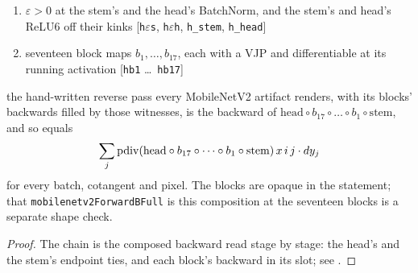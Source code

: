 \begin{theorem}
  \label{thm:mobilenetv2_whole_back}
  \leanok
  \Assume{}
  \begin{enumerate}
    \item \(\varepsilon > 0\) at the stem's and the head's BatchNorm, and the
          stem's and head's ReLU6 off their kinks
          \hfill[\texttt{h\(\varepsilon\)s}, \texttt{h\(\varepsilon\)h}, \texttt{h\_stem}, \texttt{h\_head}]
    \item seventeen block maps \(b_1, \dots, b_{17}\), each with a VJP and
          differentiable at its running activation
          \hfill[\texttt{hb1} \dots\ \texttt{hb17}]
  \end{enumerate}
  \Prove{} the hand-written reverse pass every MobileNetV2 artifact renders,
  with its blocks' backwards filled by those witnesses, is the backward of
  \(\mathrm{head} \circ b_{17} \circ \dots \circ b_1 \circ \mathrm{stem}\),
  and so equals
  \[
    \sum_j \operatorname{pdiv}(\mathrm{head} \circ b_{17} \circ \dots \circ b_1 \circ \mathrm{stem})\, x\, i\, j
  \cdot dy_j
  \]
  for every batch, cotangent and pixel. The blocks are opaque in the
  statement; that \texttt{mobilenetv2ForwardBFull} is this composition at the
  seventeen blocks is a separate shape check.
\end{theorem}

\begin{proof}
\leanok
The chain is the composed backward read stage by stage: the head's and the
stem's endpoint ties, and each block's backward in its slot; see
.
\end{proof}

